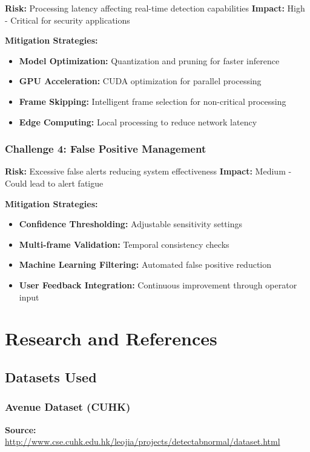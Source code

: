 \documentclass[12pt,a4paper]{article}
\begin{document}
\textbf{Risk:} Processing latency affecting real-time detection capabilities
\textbf{Impact:} High - Critical for security applications

\textbf{Mitigation Strategies:}
\begin{itemize}
    \item \textbf{Model Optimization:} Quantization and pruning for faster inference
    \item \textbf{GPU Acceleration:} CUDA optimization for parallel processing
    \item \textbf{Frame Skipping:} Intelligent frame selection for non-critical processing
    \item \textbf{Edge Computing:} Local processing to reduce network latency
\end{itemize}

\subsubsection{Challenge 4: False Positive Management}

\textbf{Risk:} Excessive false alerts reducing system effectiveness
\textbf{Impact:} Medium - Could lead to alert fatigue

\textbf{Mitigation Strategies:}
\begin{itemize}
    \item \textbf{Confidence Thresholding:} Adjustable sensitivity settings
    \item \textbf{Multi-frame Validation:} Temporal consistency checks
    \item \textbf{Machine Learning Filtering:} Automated false positive reduction
    \item \textbf{User Feedback Integration:} Continuous improvement through operator input
\end{itemize}

\section{Research and References}

\subsection{Datasets Used}

\subsubsection{Avenue Dataset (CUHK)}
\textbf{Source:} \url{http://www.cse.cuhk.edu.hk/leojia/projects/detectabnormal/dataset.html}
\end{document}
